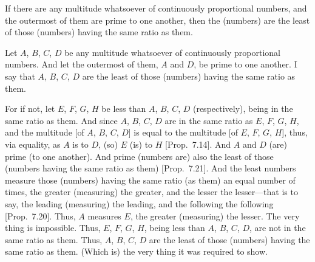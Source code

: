 \begin{Parallel}{}{}
{If there are any multitude whatsoever of continuously proportional
numbers, and the outermost of them are prime to one another, then
the (numbers) are the least of those (numbers) having the same ratio as them.

\epsfysize=0.9in
\centerline{}

Let $A$, $B$, $C$,  $D$ be any multitude whatsoever of continuously proportional
numbers. And let the outermost of them, $A$ and $D$, be prime to
one another. I say that $A$, $B$, $C$, $D$ are the least of those
(numbers) having the same ratio as them.

For if not, let $E$, $F$, $G$, $H$ be less than $A$, $B$, $C$,  $D$ (respectively),
being in the same ratio as them. And since $A$, $B$, $C$, $D$ are
in the same ratio as $E$, $F$, $G$,  $H$, and
the multitude [of $A$, $B$, $C$, $D$] is equal to the
multitude [of $E$, $F$, $G$, $H$], thus, via equality, as
$A$ is to $D$, (so) $E$ (is) to $H$ [Prop.~7.14]. 
And $A$ and $D$ (are) prime (to one another). And prime (numbers are)
also the least of those (numbers having the same ratio as them) [Prop.~7.21]. And the least numbers measure those
(numbers) having the same ratio (as them) an equal number of times, the
greater (measuring) the greater, and the lesser the lesser---that is to say,
the leading (measuring) the leading, and the following the following [Prop.~7.20]. Thus, $A$ measures $E$, the
greater (measuring) the lesser. The very thing is impossible. Thus, $E$,
$F$, $G$,  $H$, being less than $A$, $B$, $C$, $D$, are not
in the same ratio as them. Thus, $A$, $B$, $C$,  $D$ are the least of those
(numbers) having the same ratio as them. (Which is) the very thing it was required to show.}
\end{Parallel}

